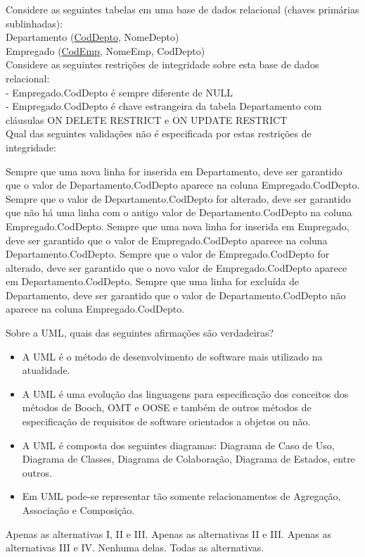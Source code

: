 \documentclass[12pt, addpoints]{exam}
\begin{document}
\begin{questions}
\question
Considere as seguintes tabelas em uma base de dados relacional (chaves primárias sublinhadas):\\
Departamento (\underline{CodDepto}, NomeDepto)\\
Empregado (\underline{CodEmp}, NomeEmp, CodDepto)\\
Considere as seguintes restrições de integridade sobre esta base de dados relacional:\\
- Empregado.CodDepto é sempre diferente de NULL\\
- Empregado.CodDepto é chave estrangeira da tabela Departamento com cláusulas ON DELETE RESTRICT e ON UPDATE RESTRICT\\
Qual das seguintes validações não é especificada por estas restrições de integridade:
\begin{choices}
\choice Sempre que uma nova linha for inserida em Departamento, deve ser garantido que o valor de Departamento.CodDepto aparece na coluna Empregado.CodDepto.
\choice Sempre que o valor de Departamento.CodDepto for alterado, deve ser garantido que não há uma linha com o antigo valor de Departamento.CodDepto na coluna Empregado.CodDepto.
\choice Sempre que uma nova linha for inserida em Empregado, deve ser garantido que o valor de Empregado.CodDepto aparece na coluna Departamento.CodDepto.
\choice Sempre que o valor de Empregado.CodDepto for alterado, deve ser garantido que o novo valor de Empregado.CodDepto aparece em Departamento.CodDepto.
\choice Sempre que uma linha for excluída de Departamento, deve ser garantido que o valor de Departamento.CodDepto não aparece na coluna Empregado.CodDepto.
\end{choices}

\question
Sobre a UML, quais das seguintes afirmações são verdadeiras?

\begin{itemize}
    \item[I)] A UML é o método de desenvolvimento de software mais utilizado na atualidade.
    \item[II)] A UML é uma evolução das linguagens para especificação dos conceitos dos métodos de Booch, OMT e OOSE e também de outros métodos de especificação de requisitos de software orientados a objetos ou não.
    \item[III)] A UML é composta dos seguintes diagramas: Diagrama de Caso de Uso, Diagrama de Classes, Diagrama de Colaboração, Diagrama de Estados, entre outros.
    \item[IV)] Em UML pode-se representar tão somente relacionamentos de Agregação, Associação e Composição.
\end{itemize}
\begin{choices}
\choice Apenas as alternativas I, II e III.
\choice Apenas as alternativas II e III.
\choice Apenas as alternativas III e IV.
\choice Nenhuma delas.
\choice Todas as alternativas.
\end{choices}


\end{questions}
\end{document}
